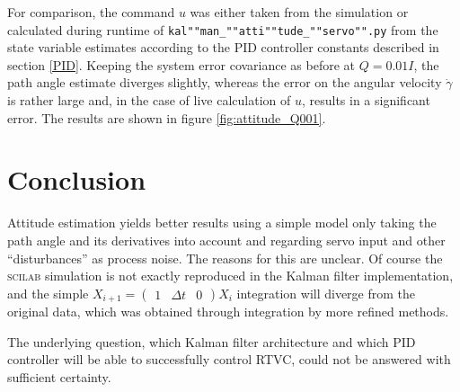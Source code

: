 \documentclass[a4paper]{article}
\begin{document}
For comparison, the command $u$ was either taken from the simulation or calculated during runtime of \texttt{kal""man\_""atti""tude\_""servo"".py} from the state variable estimates according to the PID controller constants described in section \ref{PID}. Keeping the system error covariance as before at $Q=0.01I$, the path angle estimate diverges slightly, whereas the error on the angular velocity $\dot{\gamma}$ is rather large and, in the case of live calculation of $u$, results in a significant error. The results are shown in figure \ref{fig:attitude_Q001}.

\section{Conclusion}

Attitude estimation yields better results using a simple model only taking the path angle and its derivatives into account and regarding servo input and other ``disturbances'' as process noise. The reasons for this are unclear. Of course the \textsc{scilab} simulation is not exactly reproduced in the Kalman filter implementation, and the simple $X_{i+1} = \begin{pmatrix}1 & \Delta t & 0\end{pmatrix} X_i$ integration will diverge from the original data, which was obtained through integration by more refined methods.

The underlying question, which Kalman filter architecture and which PID controller will be able to successfully control RTVC, could not be answered with sufficient certainty.
\end{document}
